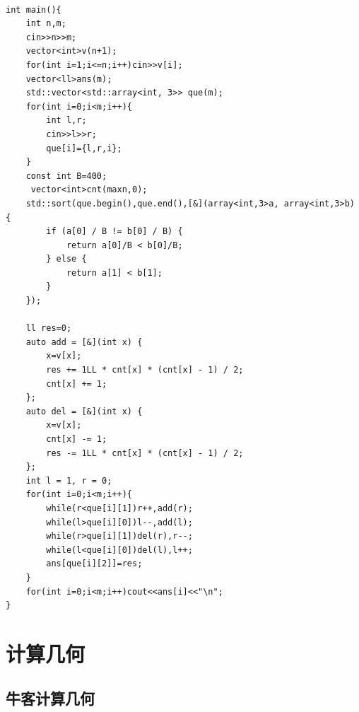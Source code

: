 \documentclass[a4paper,10pt]{article}
\begin{document}
\noindent\begin{lstlisting}

int main(){
    int n,m;
    cin>>n>>m;
    vector<int>v(n+1);
    for(int i=1;i<=n;i++)cin>>v[i];
    vector<ll>ans(m);
    std::vector<std::array<int, 3>> que(m);
    for(int i=0;i<m;i++){
        int l,r;
        cin>>l>>r;
        que[i]={l,r,i};
    }
    const int B=400;
     vector<int>cnt(maxn,0);
    std::sort(que.begin(),que.end(),[&](array<int,3>a, array<int,3>b) {
        if (a[0] / B != b[0] / B) {
            return a[0]/B < b[0]/B;
        } else {
            return a[1] < b[1];
        }
    });
    
    ll res=0;
    auto add = [&](int x) {
        x=v[x];
        res += 1LL * cnt[x] * (cnt[x] - 1) / 2;
        cnt[x] += 1;
    };
    auto del = [&](int x) {
        x=v[x];
        cnt[x] -= 1;
        res -= 1LL * cnt[x] * (cnt[x] - 1) / 2;
    };
    int l = 1, r = 0;
    for(int i=0;i<m;i++){
        while(r<que[i][1])r++,add(r);
        while(l>que[i][0])l--,add(l);
        while(r>que[i][1])del(r),r--;
        while(l<que[i][0])del(l),l++;
        ans[que[i][2]]=res;
    }
    for(int i=0;i<m;i++)cout<<ans[i]<<"\n";
}\end{lstlisting}

\section{计算几何}
\thispagestyle{fancy}

\subsection{牛客计算几何}
\thispagestyle{fancy}
\end{document}

